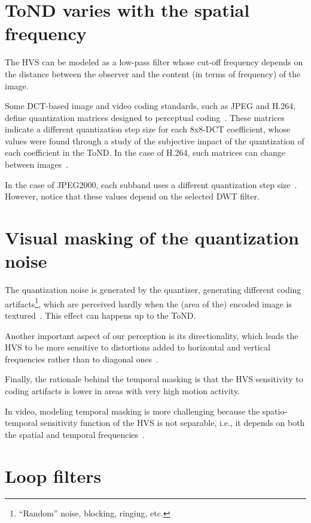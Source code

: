 \section{ToND varies with the spatial frequency}
The HVS can be modeled as a low-pass filter whose cut-off frequency
depends on the distance between the observer and the content (in terms
of frequency) of the image.

Some DCT-based image and video coding standards, such as JPEG and
H.264, define quantization matrices designed to perceptual
coding~\cite{ernawan2014optimal}. These matrices indicate a different
quantization step size for each 8x8-DCT coefficient, whose values were
found through a study of the subjective impact of the quantization of
each coefficient in the ToND. In the case of H.264, such matrices can
change between images~\cite{naccari2014perceptually}.

In the case of JPEG2000, each subband uses a different quantization
step size~\cite{liu2020visibility}. However, notice that these values
depend on the selected DWT filter.

\section{Visual masking of the quantization noise}

The quantization noise is generated by the quantizer, generating
different coding artifacts\footnote{``Random'' noise, blocking,
  ringing, etc.}, which are perceived hardly when the (area of the)
encoded image is textured~\cite{wu2017digital}. This effect can
happens up to the ToND.

Another important aspect of our perception is its directionality,
which leads the HVS to be more sensitive to distortions added to
horizontal and vertical frequencies rather than to diagonal
ones~\cite{naccari2014perceptually}.

Finally, the rationale behind the temporal masking is that the HVS
sensitivity to coding artifacts is lower in areas with very high
motion activity.

In video, modeling temporal masking is more challenging because
the spatio-temporal sensitivity function of the HVS is not separable,
i.e., it depends on both the spatial and temporal
frequencies~\cite{naccari2014perceptually}.

\section{Loop filters}


